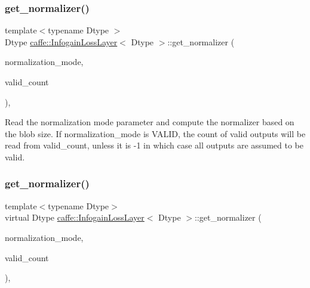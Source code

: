 \subsubsection{\texorpdfstring{get\+\_\+normalizer()}{get\_normalizer()}\hspace{0.1cm}{\footnotesize\ttfamily [1/2]}}
{\footnotesize\ttfamily template$<$typename Dtype $>$ \\
Dtype \mbox{\hyperlink{classcaffe_1_1_infogain_loss_layer}{caffe\+::\+Infogain\+Loss\+Layer}}$<$ Dtype $>$\+::get\+\_\+normalizer (\begin{DoxyParamCaption}\item[{Loss\+Parameter\+\_\+\+Normalization\+Mode}]{normalization\+\_\+mode,  }\item[{int}]{valid\+\_\+count }\end{DoxyParamCaption})\hspace{0.3cm}{\ttfamily [protected]}, {\ttfamily [virtual]}}

Read the normalization mode parameter and compute the normalizer based on the blob size. If normalization\+\_\+mode is V\+A\+L\+ID, the count of valid outputs will be read from valid\+\_\+count, unless it is -\/1 in which case all outputs are assumed to be valid. \mbox{\label{classcaffe_1_1_infogain_loss_layer_a9c223a4b6dc5a48fb56bf653111abea1}} 
\subsubsection{\texorpdfstring{get\+\_\+normalizer()}{get\_normalizer()}\hspace{0.1cm}{\footnotesize\ttfamily [2/2]}}
{\footnotesize\ttfamily template$<$typename Dtype$>$ \\
virtual Dtype \mbox{\hyperlink{classcaffe_1_1_infogain_loss_layer}{caffe\+::\+Infogain\+Loss\+Layer}}$<$ Dtype $>$\+::get\+\_\+normalizer (\begin{DoxyParamCaption}\item[{Loss\+Parameter\+\_\+\+Normalization\+Mode}]{normalization\+\_\+mode,  }\item[{int}]{valid\+\_\+count }\end{DoxyParamCaption})\hspace{0.3cm}{\ttfamily [protected]}, {\ttfamily [virtual]}}


